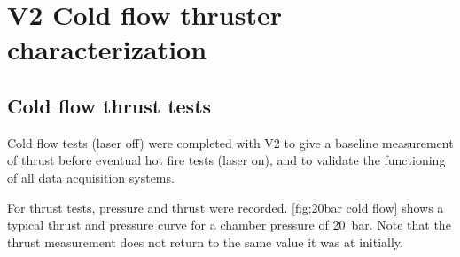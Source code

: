     





    \section{V2 Cold flow thruster characterization}

        \subsection{Cold flow thrust tests}

            Cold flow tests (laser off) were completed with V2 to give a baseline measurement of thrust before eventual hot fire tests (laser on), and to validate the functioning of all data acquisition systems.

            For thrust tests, pressure and thrust were recorded. \autoref{fig:20bar cold flow} shows a typical thrust and pressure curve for a chamber pressure of \qty{20}{bar}. Note that the thrust measurement does not return to the same value it was at initially.


